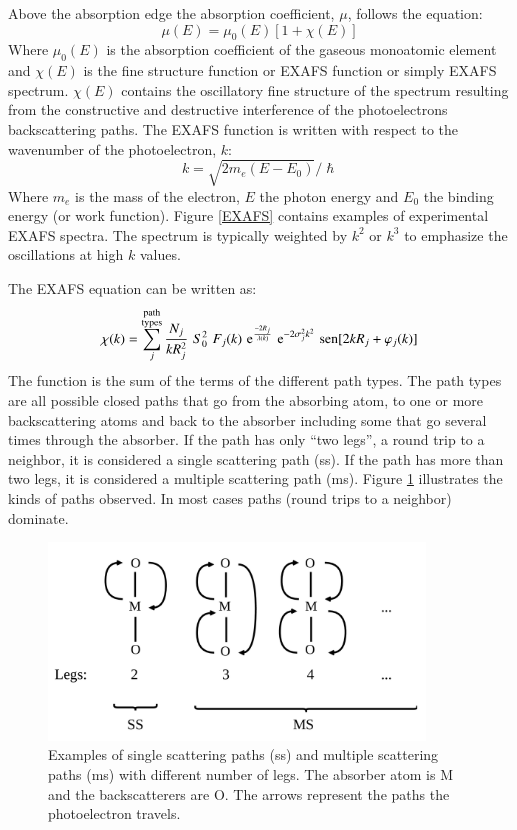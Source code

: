 Above the absorption edge the absorption coefficient, $\mu$, follows the 
equation:
\begin{equation}
\mu(E)=\mu_0(E)[1+\chi(E)]
\end{equation}
Where $\mu_0(E)$ is the absorption coefficient of the gaseous monoatomic element and $\chi(E)$ is 
the 
fine structure function or EXAFS function or simply EXAFS spectrum. $\chi(E)$ contains the 
oscillatory fine structure of the spectrum resulting from the constructive and destructive 
interference of the photoelectrons backscattering paths. The EXAFS function is written with respect 
to the wavenumber of the photoelectron, $k$:
\begin{equation}
 k=\sqrt{2m_e(E-E_0)}/\hslash
\end{equation}
Where $m_e$ is the mass of the electron, $E$ the photon energy and $E_0$ the binding energy 
(or work function). Figure \ref{EXAFS} contains examples of experimental EXAFS 
spectra. The spectrum is typically weighted by $k^2$ or $k^3$ to emphasize the 
oscillations at high $k$ values.

The EXAFS equation can be written as\cite{sayers1971new}:
\begin{equation}\label{exafs}
\chi(k)=\sum_j^{\substack{\text{path} \vspace{0.02cm}\\ \text{types} 
}}\frac{N_j}{kR_j^2}\,\,S_0^2\,\,F_j(k)\,\,\eu^{\frac{-2R_j}{\lambda(k)}}\,\,\eu^{ 
-2\sigma_j^2k^2}\,\,
\text{sen}[2kR_j+\varphi_j(k)]
\end{equation}
The function is the sum of the terms of the different path types. The path types are all 
possible closed paths that go from the absorbing atom, to one or more backscattering atoms and back 
to the absorber including some that go several times through the absorber. If the path 
has only 
``two legs'', a round trip to a neighbor, it is considered a single scattering path (\gls{ss}). 
If the 
path has more than two legs, it is considered a multiple scattering path (\gls{ms}). Figure 
\ref{MS_SS} 
illustrates the kinds of paths observed.  In most cases  paths (round trips to a neighbor) 
dominate. 

\begin{figure}
\centering 
\includegraphics[width=10cm]{./images/Paths_diagram.png}
\caption[EXAFS paths illustration]{Examples of single scattering paths (\gls{ss}) and multiple scattering 
paths 
(\gls{ms}) with different number of legs. The absorber atom is M and the backscatterers are O. The 
arrows 
represent the paths the photoelectron travels.}
\label{MS_SS}
\end{figure}

